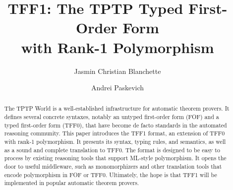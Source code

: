 \documentclass[a4paper]{llncs}
\begin{document}
\title{
TFF1: The TPTP Typed First-Order Form \\ with Rank-1
Polymorphism}

\author{
Jasmin Christian Blanchette \and
Andrei Paskevich
}


\maketitle

\setcounter{footnote}{0}

\begin{abstract}
The TPTP World is a well-established infrastructure for automatic theorem
provers. It defines several concrete syntaxes,
notably an untyped first-order form (FOF) and a typed first-order form (TFF0),
that have become de facto standards in the automated reasoning
community. This paper introduces the TFF1 format, an extension of TFF0 with
rank-1 polymorphism. It presents its syntax, typing rules, and semantics, as
well as a sound and complete translation to TFF0. The format is designed to be
easy to process by existing reasoning tools that support ML-style polymorphism.
It opens the door to useful middleware, such as monomorphizers and other
translation tools that encode polymorphism in FOF or TFF0. Ultimately, the hope
is that TFF1 will be implemented in popular automatic theorem provers.
\end{abstract}












\end{document}
